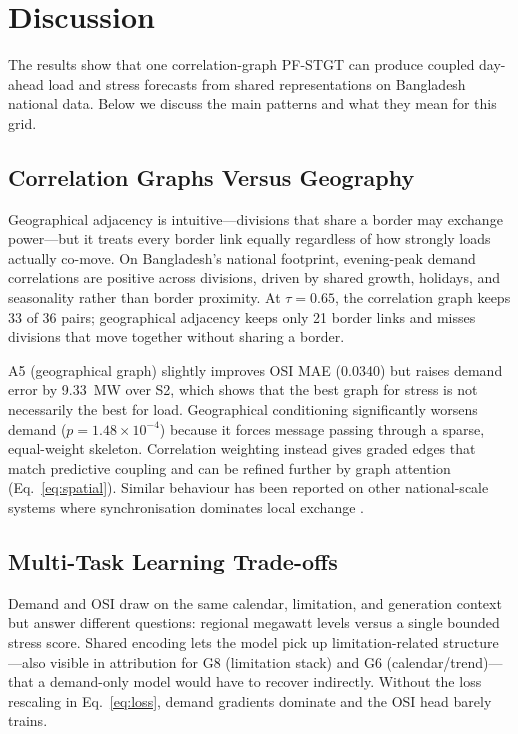 \section{Discussion}\label{sec:discussion}

The results show that one correlation-graph PF-STGT can produce coupled day-ahead load and stress forecasts from shared representations on Bangladesh national data. Below we discuss the main patterns and what they mean for this grid.

\subsection{Correlation Graphs Versus Geography}

Geographical adjacency is intuitive---divisions that share a border may exchange power---but it treats every border link equally regardless of how strongly loads actually co-move. On Bangladesh's national footprint, evening-peak demand correlations are positive across divisions, driven by shared growth, holidays, and seasonality rather than border proximity. At $\tau{=}0.65$, the correlation graph keeps 33 of 36 pairs; geographical adjacency keeps only 21 border links and misses divisions that move together without sharing a border.

A5 (geographical graph) slightly improves OSI MAE (0.0340) but raises demand error by 9.33~MW over S2, which shows that the best graph for stress is not necessarily the best for load. Geographical conditioning significantly worsens demand ($p{=}1.48{\times}10^{-4}$) because it forces message passing through a sparse, equal-weight skeleton. Correlation weighting instead gives graded edges that match predictive coupling and can be refined further by graph attention (Eq.~\eqref{eq:spatial}). Similar behaviour has been reported on other national-scale systems where synchronisation dominates local exchange \cite{Zhao2024GraphAttentionTransformer,Bentsen2023GraphTransformer}.

\subsection{Multi-Task Learning Trade-offs}

Demand and OSI draw on the same calendar, limitation, and generation context but answer different questions: regional megawatt levels versus a single bounded stress score. Shared encoding lets the model pick up limitation-related structure---also visible in attribution for G8 (limitation stack) and G6 (calendar/trend)---that a demand-only model would have to recover indirectly. Without the loss rescaling in Eq.~\eqref{eq:loss}, demand gradients dominate and the OSI head barely trains.

